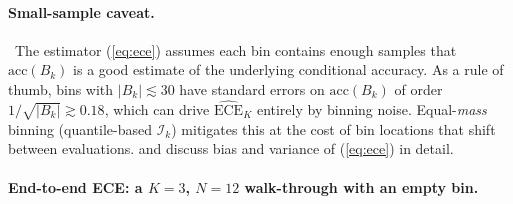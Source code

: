 \paragraph{Small-sample caveat.}
\Assum\ The estimator (\ref{eq:ece}) assumes each bin contains enough
samples that $\mathrm{acc}(B_k)$ is a good estimate of the underlying
conditional accuracy. As a rule of thumb, bins with $|B_k| \lesssim 30$
have standard errors on $\mathrm{acc}(B_k)$ of order
$1/\sqrt{|B_k|} \gtrsim 0.18$, which can drive $\widehat{\mathrm{ECE}}_K$
entirely by binning noise. Equal-\emph{mass} binning (quantile-based
$\mathcal{I}_k$) mitigates this at the cost of bin locations that shift
between evaluations. \citet{kumar2019ece} and \citet{nixon2019measuring}
discuss bias and variance of (\ref{eq:ece}) in detail.

\paragraph{End-to-end ECE: a $K=3$, $N=12$ walk-through with an
empty bin.}
